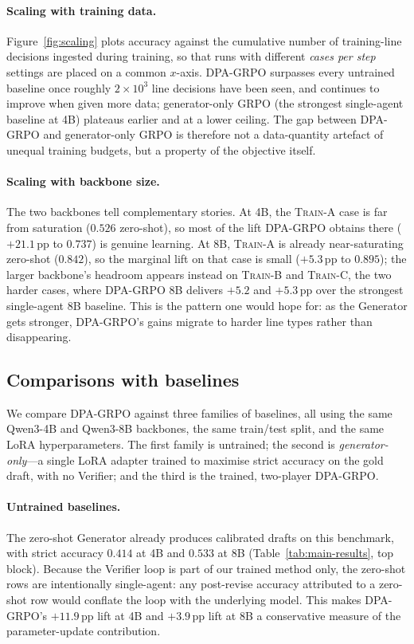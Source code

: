 \paragraph{Scaling with training data.}
Figure~\ref{fig:scaling} plots accuracy against the cumulative number of
training-line decisions ingested during training, so that runs with
different \emph{cases per step} settings are placed on a common
$x$-axis. DPA-GRPO surpasses every untrained baseline once roughly
$2{\times}10^{3}$ line decisions have been seen, and continues to
improve when given more data; generator-only GRPO (the strongest
single-agent baseline at 4B) plateaus earlier and at a lower ceiling.
The gap between DPA-GRPO and generator-only GRPO is therefore not a
data-quantity artefact of unequal training budgets, but a property of
the objective itself.

\paragraph{Scaling with backbone size.}
The two backbones tell complementary stories. At 4B, the \textsc{Train-A}
case is far from saturation ($0.526$ zero-shot), so most of the lift
DPA-GRPO obtains there ($+21.1$\,pp to $0.737$) is genuine learning.
At 8B, \textsc{Train-A} is already near-saturating zero-shot ($0.842$),
so the marginal lift on that case is small ($+5.3$\,pp to $0.895$);
the larger backbone's headroom appears instead on \textsc{Train-B} and
\textsc{Train-C}, the two harder cases, where DPA-GRPO 8B delivers
$+5.2$ and $+5.3$\,pp over the strongest single-agent 8B baseline.
This is the pattern one would hope for: as the Generator gets stronger,
DPA-GRPO's gains migrate to harder line types rather than disappearing.

\subsection{Comparisons with baselines}
\label{sec:exp-baselines}

We compare DPA-GRPO against three families of baselines, all using the
same Qwen3-4B and Qwen3-8B backbones, the same train/test split, and the
same LoRA hyperparameters. The first family is untrained; the second is
\emph{generator-only}---a single LoRA adapter trained to maximise strict
accuracy on the gold draft, with no Verifier; and the third is the
trained, two-player DPA-GRPO.

\paragraph{Untrained baselines.}
The zero-shot Generator already produces calibrated drafts on this
benchmark, with strict accuracy $0.414$ at 4B and $0.533$ at 8B
(Table~\ref{tab:main-results}, top block). Because the Verifier loop is
part of our trained method only, the zero-shot rows are intentionally
single-agent: any post-revise accuracy attributed to a zero-shot row
would conflate the loop with the underlying model. This makes
DPA-GRPO's $+11.9$\,pp lift at 4B and $+3.9$\,pp lift at 8B a
conservative measure of the parameter-update contribution.

